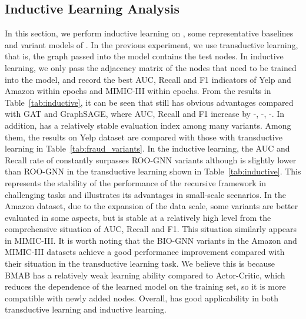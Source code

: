 \subsection{Inductive Learning Analysis}\label{sec:inductive}
In this section, we perform inductive learning on \RioGNN, some representative baselines and variant models of \RioGNN.
In the previous experiment, we use transductive learning, that is, the graph passed into the model contains the test nodes. 
In inductive learning, we only pass the adjacency matrix of the nodes that need to be trained into the model, and record the best AUC, Recall and F1 indicators of Yelp and Amazon within  epochs and MIMIC-III within  epochs.
From the results in Table~\ref{tab:inductive}, it can be seen that \RioGNN still has obvious advantages compared with GAT and GraphSAGE, where AUC, Recall and F1 increase by -, -, -.
In addition, \RioGNN has a relatively stable evaluation index among many variants. 
Among them, the results on Yelp dataset are compared with those with transductive learning in Table~\ref{tab:fraud_variants}.
In the inductive learning, the AUC and Recall rate of \RioGNN constantly surpasses ROO-GNN variants although \RioGNN is slightly lower than ROO-GNN in the transductive learning shown in Table~\ref{tab:inductive}.
This represents the stability of the performance of the recursive framework in challenging tasks and illustrates its advantages in small-scale scenarios.
In the Amazon dataset, due to the expansion of the data scale, some variants are better evaluated in some aspects, but \RioGNN is stable at a relatively high level from the comprehensive situation of AUC, Recall and F1. 
This situation similarly appears in MIMIC-III. 
It is worth noting that the BIO-GNN variants in the Amazon and MIMIC-III datasets achieve a good performance improvement compared with their situation in the transductive learning task. 
We believe this is because BMAB has a relatively weak learning ability compared to Actor-Critic, which reduces the dependence of the learned model on the training set, so it is more compatible with newly added nodes.
Overall, \RioGNN has good applicability in both transductive learning and inductive learning.




